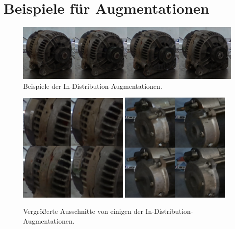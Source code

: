 %
%

\newpage

\section{Beispiele für Augmentationen} \label{sec:app2}

\begin{figure}[h]
  \centering
  \includegraphics[width=\textwidth]{images/figure_results_id-augs_good_1a.png}
  \caption{Beispiele der In-Distribution-Augmentationen.}
  \label{fig:id-augs-good-1}
\end{figure}

\begin{figure}[h]
  \centering
  \includegraphics[width=0.48\textwidth]{images/figure_results_id-augs_good_1.png}%
  \hspace{0.02\textwidth}\includegraphics[width=0.48\textwidth]{figure_results_id-augs_good_2.png}%
  \caption{Vergrößerte Ausschnitte von einigen der In-Distribution-Augmentationen.}
  \label{fig:id-augs-good-2}
\end{figure}

